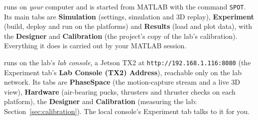 \documentclass[11pt,a4paper]{article}
\newcommand{\ui}[1]{\textsf{\textbf{#1}}}
\newcommand{\pth}[1]{\texttt{#1}}
\newcommand{\fn}[1]{\texttt{#1}}
\begin{document}
\begin{description}[leftmargin=1.2em]
  \item[The local console (``SPOT Local Simulations'')] runs on \emph{your} computer and is started from MATLAB
        with the command \fn{SPOT}. Its main tabs are \ui{Simulation} (settings, simulation and 3D replay),
        \ui{Experiment} (build, deploy and run on the platforms) and \ui{Results} (load and plot data), with the
        \ui{Designer} and \ui{Calibration} (the project's copy of the lab's calibration). Everything it does is
        carried out by your MATLAB session.
  \item[The hardware console (``SPOT Hardware Interfaces'')] runs on the lab's \emph{lab console}, a Jetson TX2
        at \pth{http://192.168.1.116:8080} (the Experiment tab's \ui{Lab Console (TX2) Address}), reachable only on the
        lab network. Its tabs are
        \ui{PhaseSpace} (the motion-capture stream and a live 3D view), \ui{Hardware} (air-bearing pucks,
        thrusters and thruster checks on each platform), the \ui{Designer} and \ui{Calibration} (measuring the lab:
        Section~\ref{sec:calibration}). The local console's Experiment tab talks to it for you.
\end{description}
\end{document}
